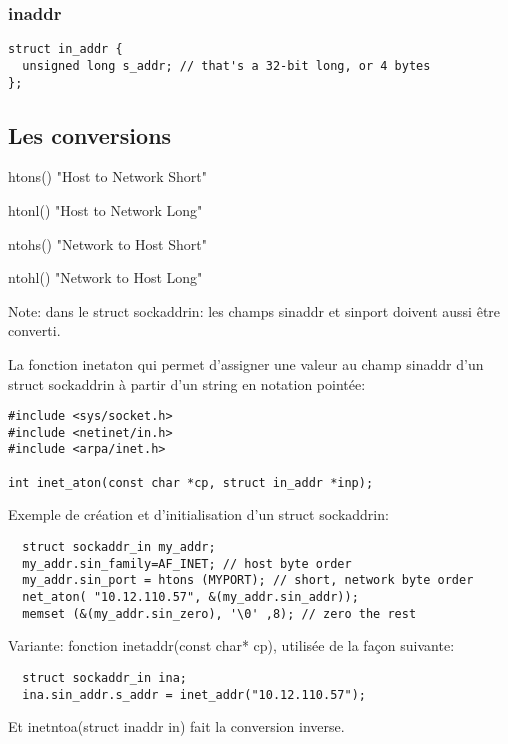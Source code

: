 \documentclass[a4paper]{article}
\begin{document}
\subsubsection{in\textunderscore{}addr}
\begin{lstlisting}
struct in_addr {
  unsigned long s_addr; // that's a 32-bit long, or 4 bytes
};
\end{lstlisting}
\subsection{Les conversions}
\begin{description}
  \item htons() "Host to Network Short"
  \item htonl() "Host to Network Long"
  \item ntohs() "Network to Host Short"
  \item ntohl() "Network to Host Long"
\end{description}
Note: dans le struct sockaddr\textunderscore{}in:\newline
les champs sin\textunderscore{}addr et sin\textunderscore{}port doivent aussi être converti.\par
La fonction inet\textunderscore{}aton qui permet d'assigner une valeur au champ sin\textunderscore{}addr d'un struct sockaddr\textunderscore{}in à partir d'un string en notation pointée:
\begin{lstlisting}
#include <sys/socket.h>
#include <netinet/in.h>
#include <arpa/inet.h>

int inet_aton(const char *cp, struct in_addr *inp);
\end{lstlisting}
Exemple de création et d'initialisation d'un struct sockaddr\textunderscore{}in:
\begin{lstlisting}
  struct sockaddr_in my_addr;
  my_addr.sin_family=AF_INET; // host byte order
  my_addr.sin_port = htons (MYPORT); // short, network byte order
  net_aton( "10.12.110.57", &(my_addr.sin_addr));
  memset (&(my_addr.sin_zero), '\0' ,8); // zero the rest
\end{lstlisting}
Variante: fonction inet\textunderscore{}addr(const char* cp), utilisée de la façon suivante:
\begin{lstlisting}
  struct sockaddr_in ina;
  ina.sin_addr.s_addr = inet_addr("10.12.110.57");
\end{lstlisting}
Et inet\textunderscore{}ntoa(struct in\textunderscore{}addr in) fait la conversion inverse.
\end{document}
